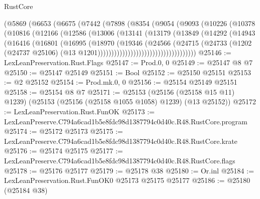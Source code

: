 \begin{lexlean}{RustCore}
\begin{coremodule}
                  (@5869
                    (@6653
                      (@6675
                        (@7442
                          (@7898
                            (@8354
                              (@9054
                                (@9093
                                  (@10226
                                    (@10378
                                      (@10816
                                        (@12166
                                          (@12586
                                            (@13006
                                              (@13141
                                                (@13179
                                                  (@13849
                                                    (@14292
                                                      (@14943
                                                        (@16416
                                                          (@16801
                                                            (@16995
                                                              (@18970
                                                                (@19346
                                                                  (@24566
                                                                    (@24715
                                                                      (@24733
                                                                        (@1202
                                                                          (@24737 @25106)
                                                                          (@13
                                                                            @1201))))))))))))))))))))))))))))))))))))
@25146 := LexLeanPreservation.Rust.Flags
@25147 := Prod.{0, 0}
@25149 := @25147 @8 @7
@25150 := @25147 @25149
@25151 := Bool
@25152 := @25150 @25151
@25153 := @2 @25152
@25154 := Prod.mk.{0, 0}
@25156 := @25154 @25149 @25151
@25158 := @25154 @8 @7
@25171 := @25153
    (@25156 (@25158 @15 @11) @1239)
    (@25153 (@25156 (@25158 @1055 @1058) @1239) (@13 @25152))
@25172 := LexLeanPreservation.Rust.FunOK
@25173 := LexLeanPreserve.C794a6cad1b5e8fdc98d1387794c0d40c.R48.RustCore.program
@25174 := @25172 @25173
@25175 := LexLeanPreserve.C794a6cad1b5e8fdc98d1387794c0d40c.R48.RustCore.krate
@25176 := @25174 @25175
@25177 := LexLeanPreserve.C794a6cad1b5e8fdc98d1387794c0d40c.R48.RustCore.flags
@25178 := @25176 @25177
@25179 := @25178 @38
@25180 := Or.inl
@25184 := LexLeanPreservation.Rust.FunOK0 @25173 @25175 @25177
@25186 := @25180 (@25184 @38)

\end{coremodule}
\end{lexlean}
